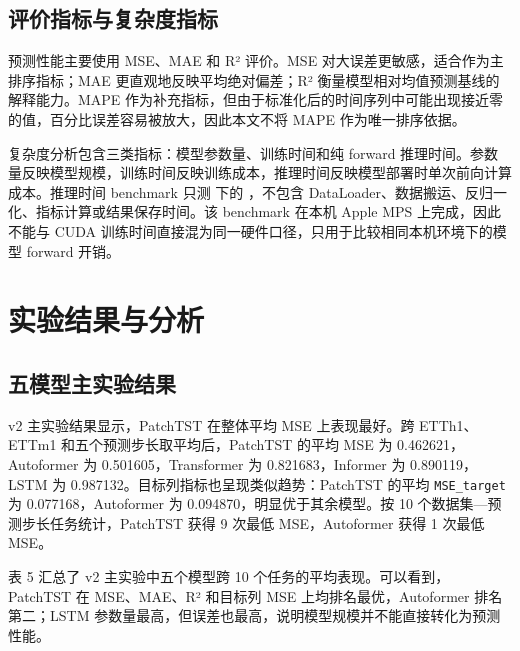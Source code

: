 \subsection{评价指标与复杂度指标}\label{ux8bc4ux4ef7ux6307ux6807ux4e0eux590dux6742ux5ea6ux6307ux6807}

预测性能主要使用 MSE、MAE 和 R² 评价。MSE 对大误差更敏感，适合作为主排序指标；MAE 更直观地反映平均绝对偏差；R² 衡量模型相对均值预测基线的解释能力。MAPE 作为补充指标，但由于标准化后的时间序列中可能出现接近零的值，百分比误差容易被放大，因此本文不将 MAPE 作为唯一排序依据。

复杂度分析包含三类指标：模型参数量、训练时间和纯 forward 推理时间。参数量反映模型规模，训练时间反映训练成本，推理时间反映模型部署时单次前向计算成本。推理时间 benchmark 只测  下的 ，不包含 DataLoader、数据搬运、反归一化、指标计算或结果保存时间。该 benchmark 在本机 Apple MPS 上完成，因此不能与 CUDA 训练时间直接混为同一硬件口径，只用于比较相同本机环境下的模型 forward 开销。

\section{实验结果与分析}\label{ux5b9eux9a8cux7ed3ux679cux4e0eux5206ux6790}

\subsection{五模型主实验结果}\label{ux4e94ux6a21ux578bux4e3bux5b9eux9a8cux7ed3ux679c}

v2 主实验结果显示，PatchTST 在整体平均 MSE 上表现最好。跨 ETTh1、ETTm1 和五个预测步长取平均后，PatchTST 的平均 MSE 为 0.462621，Autoformer 为 0.501605，Transformer 为 0.821683，Informer 为 0.890119，LSTM 为 0.987132。目标列指标也呈现类似趋势：PatchTST 的平均 \texttt{MSE\_target} 为 0.077168，Autoformer 为 0.094870，明显优于其余模型。按 10 个数据集---预测步长任务统计，PatchTST 获得 9 次最低 MSE，Autoformer 获得 1 次最低 MSE。

表 5 汇总了 v2 主实验中五个模型跨 10 个任务的平均表现。可以看到，PatchTST 在 MSE、MAE、R² 和目标列 MSE 上均排名最优，Autoformer 排名第二；LSTM 参数量最高，但误差也最高，说明模型规模并不能直接转化为预测性能。


